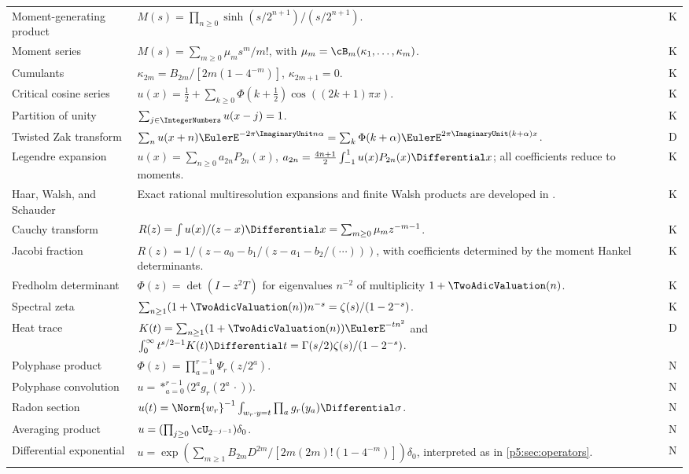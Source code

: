 \documentclass[11pt]{article}
\theoremstyle{definition}
\theoremstyle{remark}
\newcommand{\statusknown}{\textsf{K}}
\newcommand{\statusderived}{\textsf{D}}
\newcommand{\statusnew}{\textsf{N}}
\begin{document}
\begin{longtable}{@{}p{}p{}p{}@{}}
Moment-generating product &
$M(s)=\prod_{n\ge0}\sinh(s/2^{n+1})/(s/2^{n+1})$. & \statusknown\\
Moment series &
$M(s)=\sum_{m\ge0}\mu_ms^m/m!$, with
$\mu_m=\cB_m(\kappa_1,\ldots,\kappa_m)$. & \statusknown\\
Cumulants &
$\kappa_{2m}=B_{2m}/[2m(1-4^{-m})]$, $\kappa_{2m+1}=0$. & \statusknown\\
Critical cosine series &
$u(x)=\tfrac12+\sum_{k\ge0}\Phi(k+\tfrac12)\cos((2k+1)\pi x)$. & \statusknown\\
Partition of unity &
$\sum_{j\in\IntegerNumbers}u(x-j)=1$. & \statusknown\\
Twisted Zak transform &
$\sum_nu(x+n)\EulerE^{-2\pi\ImaginaryUnit n\alpha}
=\sum_k\Phi(k+\alpha)\EulerE^{2\pi\ImaginaryUnit(k+\alpha)x}$. & \statusderived\\
Legendre expansion &
$u(x)=\sum_{n\ge0}a_{2n}P_{2n}(x)$,
$a_{2n}=\frac{4n+1}{2}\int_{-1}^{1}u(x)P_{2n}(x)\Differential x$;
all coefficients reduce to moments. & \statusknown\\
Haar, Walsh, and Schauder &
Exact rational multiresolution expansions and finite Walsh products are developed in \cite{p5:repoMultiresolution}. & \statusknown\\
Cauchy transform &
$R(z)=\int u(x)/(z-x)\Differential x=\sum_{m\ge0}\mu_mz^{-m-1}$. & \statusknown\\
Jacobi fraction &
$R(z)=1/(z-a_0-b_1/(z-a_1-b_2/(\cdots)))$, with coefficients determined by the moment Hankel determinants. & \statusknown\\
Fredholm determinant &
$\Phi(z)=\det(I-z^2T)$ for eigenvalues $n^{-2}$ of multiplicity $1+\TwoAdicValuation(n)$. & \statusknown\\
Spectral zeta &
$\sum_{n\ge1}(1+\TwoAdicValuation(n))n^{-s}=\zeta(s)/(1-2^{-s})$. & \statusknown\\
Heat trace &
$K(t)=\sum_{n\ge1}(1+\TwoAdicValuation(n))\EulerE^{-tn^2}$ and
$\int_0^\infty t^{s/2-1}K(t)\Differential t=\Gamma(s/2)\zeta(s)/(1-2^{-s})$. & \statusderived\\
Polyphase product &
$\Phi(z)=\prod_{a=0}^{r-1}\Psi_r(z/2^a)$. & \statusnew\\
Polyphase convolution &
$u=*_{a=0}^{r-1}\bigl(2^ag_r(2^a\,\cdot)\bigr)$. & \statusnew\\
Radon section &
$u(t)=\Norm{w_r}^{-1}\int_{w_r\cdot y=t}\prod_ag_r(y_a)\Differential\sigma$. & \statusnew\\
Averaging product &
$u=(\prod_{j\ge0}\cU_{2^{-j-1}})\delta_0$. & \statusnew\\
Differential exponential &
$u=\exp(\sum_{m\ge1}B_{2m}D^{2m}/[2m(2m)!(1-4^{-m})])\delta_0$, interpreted as in \cref{p5:sec:operators}. & \statusnew\\
\bottomrule
\end{longtable}
\end{document}
